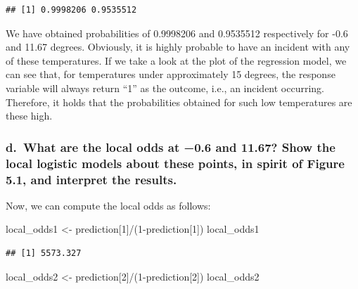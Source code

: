 \documentclass[
]{article}
\newenvironment{Shaded}{\begin{snugshade}}{\end{snugshade}}
\newcommand{\DecValTok}[1]{\textcolor[rgb]{0.00,0.00,0.81}{#1}}
\newcommand{\NormalTok}[1]{#1}
\newcommand{\OtherTok}[1]{\textcolor[rgb]{0.56,0.35,0.01}{#1}}
\newcommand{\SpecialCharTok}[1]{\textcolor[rgb]{0.00,0.00,0.00}{#1}}
\begin{document}
\begin{verbatim}
## [1] 0.9998206 0.9535512
\end{verbatim}

We have obtained probabilities of 0.9998206 and 0.9535512 respectively
for -0.6 and 11.67 degrees. Obviously, it is highly probable to have an
incident with any of these temperatures. If we take a look at the plot
of the regression model, we can see that, for temperatures under
approximately 15 degrees, the response variable will always return ``1''
as the outcome, i.e., an incident occurring. Therefore, it holds that
the probabilities obtained for such low temperatures are these high.

\hypertarget{d.-what-are-the-local-odds-at-0.6-and-11.67-show-the-local-logistic-models-about-these-points-in-spirit-of-figure-5.1-and-interpret-the-results.}{%
\subsubsection{d.~What are the local odds at −0.6 and 11.67? Show the
local logistic models about these points, in spirit of Figure 5.1, and
interpret the
results.}\label{d.-what-are-the-local-odds-at-0.6-and-11.67-show-the-local-logistic-models-about-these-points-in-spirit-of-figure-5.1-and-interpret-the-results.}}

Now, we can compute the local odds as follows:

\begin{Shaded}
\begin{Highlighting}[]
\NormalTok{local\_odds1 }\OtherTok{\textless{}{-}}\NormalTok{ prediction[}\DecValTok{1}\NormalTok{]}\SpecialCharTok{/}\NormalTok{(}\DecValTok{1}\SpecialCharTok{{-}}\NormalTok{prediction[}\DecValTok{1}\NormalTok{])}
\NormalTok{local\_odds1}
\end{Highlighting}
\end{Shaded}

\begin{verbatim}
## [1] 5573.327
\end{verbatim}

\begin{Shaded}
\begin{Highlighting}[]
\NormalTok{local\_odds2 }\OtherTok{\textless{}{-}}\NormalTok{ prediction[}\DecValTok{2}\NormalTok{]}\SpecialCharTok{/}\NormalTok{(}\DecValTok{1}\SpecialCharTok{{-}}\NormalTok{prediction[}\DecValTok{2}\NormalTok{])}
\NormalTok{local\_odds2}
\end{Highlighting}
\end{Shaded}
\end{document}
